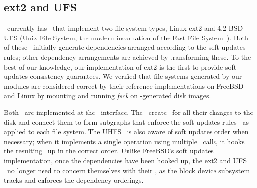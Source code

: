\begin{comment}
An example configuration taking advantage of this ability could be a file
system image mounted with an external journal, both of which are loopback block
devices stored on the root file system (which could use soft updates). The
journaled file system's ordering requirements are sent through the loopback
device as \patches, allowing dependency information to be maintained across
boundaries that might otherwise lose that information. In contrast, without
\patches\ and the ability to forward \patches\ through loopback devices, BSD
cannot express soft updates' consistency requirements through loopback devices.
Although the use of a loopback device is somewhat contrived in the example,
they are increasingly being used in conventional operating systems. For
instance, Mac OS X uses them in order to allow users to encrypt their home
directories.
\end{comment}

\subsection{ext2 and UFS}

\Kudos\ currently has \modules\ that implement two file system types, Linux
ext2 and 4.2 BSD UFS (Unix File System, the modern incarnation of the Fast File
System~\cite{mckusick84fast}).
%
Both of these \modules\ initially generate dependencies arranged according to the
soft updates rules; other dependency arrangements are achieved by transforming these.
%
%
To the best of our knowledge, our implementation of ext2 is the first to provide
soft updates consistency guarantees.
%
%
%
We verified that file systems generated by our modules are considered
correct by their reference implementations on FreeBSD and Linux by mounting
and running \emph{fsck} on \Kudos-generated disk images.

Both \modules\ are implemented at the \LFS\ interface. 
%
%
The \modules\ create \patches\ for all their changes to the disk and
connect them to form subgraphs that enforce the soft updates
rules~\cite{ganger00soft} as applied to each file system. 
%
The UHFS \module\ is also aware of soft updates order when necessary; when
it implements a single operation using multiple \LFS\ calls, it hooks the
resulting \patches\ up in the correct order.
%
Unlike FreeBSD's soft updates implementation, once the dependencies have
been hooked up, the ext2 and UFS \modules\ no longer need to concern
themselves with their \patches, as the block device subsystem tracks and
enforces the dependency orderings.

